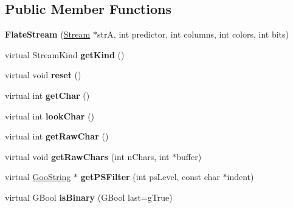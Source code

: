 \subsection*{Public Member Functions}
\begin{DoxyCompactItemize}
\item 
\mbox{\label{class_flate_stream_acdebcc2e3f80635b78c1188e250acc77}} 
{\bfseries Flate\+Stream} (\hyperlink{class_stream}{Stream} $\ast$strA, int predictor, int columns, int colors, int bits)
\item 
\mbox{\label{class_flate_stream_a35e84fbf0673c6d103d7ad0902dea21e}} 
virtual Stream\+Kind {\bfseries get\+Kind} ()
\item 
\mbox{\label{class_flate_stream_abfcc57df1b0ec8273375406f61fc4915}} 
virtual void {\bfseries reset} ()
\item 
\mbox{\label{class_flate_stream_ae2bf5baf55363e620b73d9d6178b16ff}} 
virtual int {\bfseries get\+Char} ()
\item 
\mbox{\label{class_flate_stream_a81b9389f0fa475e2492803daca5fb1ff}} 
virtual int {\bfseries look\+Char} ()
\item 
\mbox{\label{class_flate_stream_aed25f6f2742e39f077302ce2446a3225}} 
virtual int {\bfseries get\+Raw\+Char} ()
\item 
\mbox{\label{class_flate_stream_a3538f3d7db0b27c540ba3b52e1850c60}} 
virtual void {\bfseries get\+Raw\+Chars} (int n\+Chars, int $\ast$buffer)
\item 
\mbox{\label{class_flate_stream_a023b81d2e1246d75b72c420e75c35a1f}} 
virtual \hyperlink{class_goo_string}{Goo\+String} $\ast$ {\bfseries get\+P\+S\+Filter} (int ps\+Level, const char $\ast$indent)
\item 
\mbox{\label{class_flate_stream_ad0433cee24ead0f65437647c982bca84}} 
virtual G\+Bool {\bfseries is\+Binary} (G\+Bool last=g\+True)
\item 
\mbox{\label{class_flate_stream_acdebcc2e3f80635b78c1188e250acc77}} 

\end{DoxyCompactItemize}
